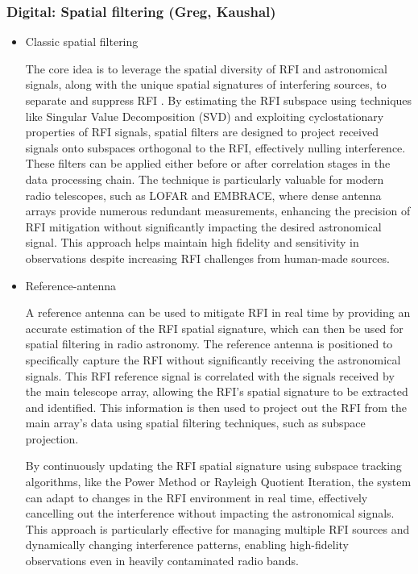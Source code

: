 \subsubsection{Digital: Spatial filtering (Greg, Kaushal)}
\begin{itemize}
\item Classic spatial filtering

The core idea is to leverage the spatial diversity of RFI and astronomical signals, along with the unique spatial signatures of interfering sources, to separate and suppress RFI \cite{hellbourg2014radio,hellbourg2016spatial,hellbourg2014rfi}. By estimating the RFI subspace using techniques like Singular Value Decomposition (SVD) and exploiting cyclostationary properties of RFI signals, spatial filters are designed to project received signals onto subspaces orthogonal to the RFI, effectively nulling interference. These filters can be applied either before or after correlation stages in the data processing chain. The technique is particularly valuable for modern radio telescopes, such as LOFAR and EMBRACE, where dense antenna arrays provide numerous redundant measurements, enhancing the precision of RFI mitigation without significantly impacting the desired astronomical signal. This approach helps maintain high fidelity and sensitivity in observations despite increasing RFI challenges from human-made sources.

\item Reference-antenna

A reference antenna can be used to mitigate RFI in real time by providing an accurate estimation of the RFI spatial signature, which can then be used for spatial filtering in radio astronomy. The reference antenna is positioned to specifically capture the RFI without significantly receiving the astronomical signals. This RFI reference signal is correlated with the signals received by the main telescope array, allowing the RFI's spatial signature to be extracted and identified. This information is then used to project out the RFI from the main array's data using spatial filtering techniques, such as subspace projection.

By continuously updating the RFI spatial signature using subspace tracking algorithms, like the Power Method or Rayleigh Quotient Iteration, the system can adapt to changes in the RFI environment in real time, effectively cancelling out the interference without impacting the astronomical signals. This approach is particularly effective for managing multiple RFI sources and dynamically changing interference patterns, enabling high-fidelity observations even in heavily contaminated radio bands\cite{hellbourg2014reference,sardarabadi2015spatial}.

\end{itemize}
